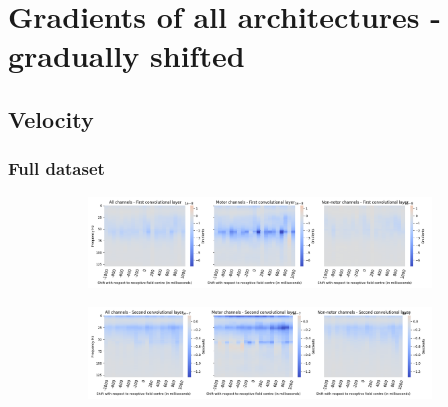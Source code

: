 \chapter{Gradients of all architectures - gradually shifted}\label{appendixC}

\section*{Velocity}\label{sec:velocity-appendixC}

\subsection*{Full dataset}\label{subsec:vel-full-dataset-appendixC}
\begin{figure}[!htpb]
\centering
\begin{subfigure}[b]{\textwidth}
   \includegraphics[width=1\linewidth]{img/appendix/C/m/vel/sbp0_m_shift_gradients_conv_2_all_kinds}
   \caption{}
   \label{fig:vel-shifting-grads-conv-2}
\end{subfigure}

\begin{subfigure}[b]{\textwidth}
   \includegraphics[width=1\linewidth]{img/appendix/C/m/vel/sbp0_m_shift_gradients_conv_3_all_kinds}
   \caption{}
   \label{fig:vel-shifting-grads-conv-3}
\end{subfigure}
\end{figure}
\clearpage
